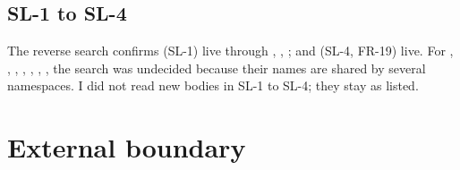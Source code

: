 \documentclass[11pt]{article}
\newcommand{\FR}[1]{\textsf{FR-#1}}
\newcommand{\SL}[1]{\textsf{SL-#1}}
\theoremstyle{remark}
\begin{document}
\subsection{\SL{1} to \SL{4}}

The reverse search confirms  (\SL{1}) live through , , ;  and  (\SL{4}, \FR{19}) live. For , , , , , , ,  the search was undecided because their names are shared by several namespaces. I did not read new bodies in \SL{1} to \SL{4}; they stay as listed.

\section{External boundary}\label{sec:boundary}
\end{document}
